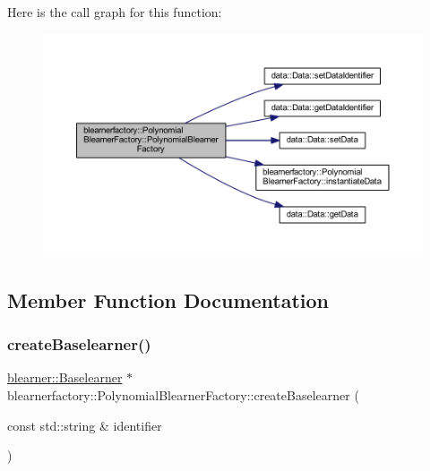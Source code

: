 Here is the call graph for this function\+:\nopagebreak
\begin{figure}[H]
\begin{center}
\leavevmode
\includegraphics[width=350pt]{classblearnerfactory_1_1_polynomial_blearner_factory_a87a3247a9abe49009e1e951f25ed97cf_cgraph}
\end{center}
\end{figure}


\subsection{Member Function Documentation}
\mbox{\label{classblearnerfactory_1_1_polynomial_blearner_factory_ac0c7f742da0a2de444e91a0cfb0a9384}} 
\subsubsection{\texorpdfstring{create\+Baselearner()}{createBaselearner()}}
{\footnotesize\ttfamily \mbox{\hyperlink{classblearner_1_1_baselearner}{blearner\+::\+Baselearner}} $\ast$ blearnerfactory\+::\+Polynomial\+Blearner\+Factory\+::create\+Baselearner (\begin{DoxyParamCaption}\item[{const std\+::string \&}]{identifier }\end{DoxyParamCaption})\hspace{0.3cm}{\ttfamily [virtual]}}




